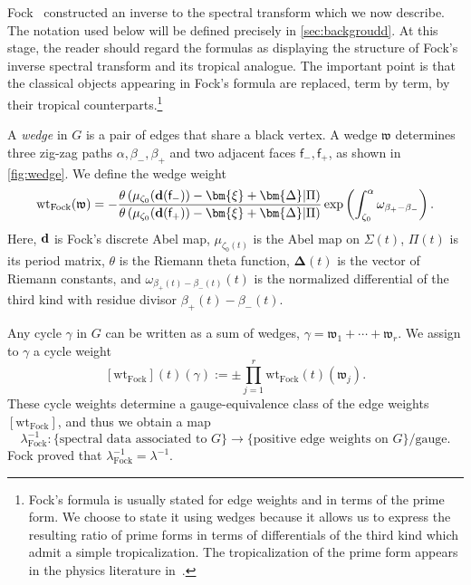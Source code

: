 \documentclass[12pt]{amsart}
\numberwithin{equation}{section}
\theoremstyle{definition}
\def\Gtor{G}
\newcommand{\wt}{\mathrm{wt}}
\def\bface{\mathsf{f}}
\def\dam{{\bf d}}
\def\vecRC{\bm{\Delta}}
\def\vecptjac{\bm{\xi}}
\def\ptSig{\zeta}
\def\basept{{\ptSig_0}}
\def\mcurve{\Sigma}
\begin{document}
Fock~\cite{Fock} constructed an inverse to the spectral transform which we now describe. The notation used below will be defined precisely in \cref{sec:backgroudd}. At this stage, the reader should regard the
formulas as displaying the structure of Fock's inverse spectral
transform and its tropical analogue. The important point is that the
classical objects appearing in Fock's formula are replaced, term by
term, by their tropical counterparts.\footnote{Fock's formula is usually stated for edge weights and in terms of the prime form. We choose to state it using wedges because it allows us to express the resulting ratio of prime forms in terms of differentials of the third kind which admit a simple tropicalization. The tropicalization of the prime form appears in the physics literature in~\cite{Tourkine}.} 

A \emph{wedge} in $\Gtor$ is a pair of edges that share a black vertex. A wedge $\mathfrak w$ determines three zig-zag paths
$\alpha,\beta_-,\beta_+$ and two adjacent faces
$\bface_-,\bface_+$, as shown in \cref{fig:wedge}. We define the wedge weight 
\begin{equation}
\label{eq:fock-weight-intro}
\wt_{\mathrm{Fock}}(\mathfrak w)
=
-\frac{
\theta\left(
\mu_{\basept}(\dam(\bface_-))
-\vecptjac+\vecRC
\middle|
\Pi
\right)
}{
\theta\left(
\mu_{\basept}(\dam(\bface_+))
-\vecptjac+\vecRC
\middle|
\Pi
\right)
}
\exp\left(
\int_{\basept}^{\alpha}
\omega_{\beta_+-\beta_-}
\right).
\end{equation}
Here, $\dam$ is Fock's discrete Abel map,
$\mu_{\basept(t)}$ is the Abel map on $\mcurve(t)$,
$\Pi(t)$ is its period matrix, $\theta$ is the Riemann theta function,
$\vecRC(t)$ is the vector of Riemann constants, and
$\omega_{\beta_+(t)-\beta_-(t)}(t)$ is the normalized differential of
the third kind with residue divisor
$\beta_+(t)-\beta_-(t)$. 

Any cycle $\gamma$ in $\Gtor$ can be written as a sum of wedges,
$
\gamma
=
\mathfrak w_1+\cdots+\mathfrak w_r.
$
We assign to $\gamma$ a cycle weight
\begin{equation}\label{eq:fock_intro_cycle}
   [\wt_{\mathrm{Fock}}](t)(\gamma) := \pm \prod_{j=1}^r  \wt_{\mathrm{Fock}}(t)(\mathfrak w_j).
\end{equation}
These cycle weights determine a
gauge-equivalence class of the edge weights $[\wt_{\mathrm{Fock}}]$, and thus we obtain a map
\[
\lambda^{-1}_{\mathrm{Fock}}:
\{
\text{spectral data associated to $\Gtor$}
\}
\rightarrow
\{
\text{positive edge weights on $\Gtor$}
\}/\text{gauge}.
\]
Fock proved that $\lambda^{-1}_{\mathrm{Fock}}  = \lambda^{-1}$.
\end{document}
